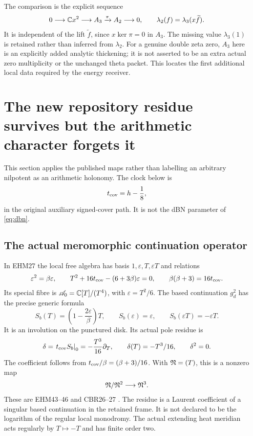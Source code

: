 \documentclass[11pt,a4paper]{article}
\theoremstyle{definition}
\begin{document}
The comparison is the explicit sequence
\[
 0\longrightarrow\mathbb C x^2\longrightarrow A_3
 \xrightarrow{\pi}A_2\longrightarrow0,
 \qquad \lambda_2(f)=\lambda_3(x\widetilde f).
\]
It is independent of the lift $\widetilde f$, since $x\ker\pi=0$ in $A_3$. The missing value $\lambda_3(1)$ is retained rather than inferred from $\lambda_2$. For a genuine double zeta zero, $A_3$ here is an explicitly added analytic thickening; it is not asserted to be an extra actual zero multiplicity or the unchanged theta packet. This locates the first additional local data required by the energy receiver.

\section{The new repository residue survives but the arithmetic character forgets it}
This section applies the published maps rather than labelling an arbitrary nilpotent as an arithmetic holonomy. The clock below is
\[
 t_{\rm cov}=h-\frac18,
\]
in the original auxiliary signed-cover path. It is not the dBN parameter of \eqref{eq:dbn}.

\subsection{The actual meromorphic continuation operator}
In EHM27 the local free algebra has basis $1,\varepsilon,T,\varepsilon T$ and relations
\[
 \varepsilon^2=\beta\varepsilon,
 \qquad T^2+16t_{\rm cov}-(6+3\beta)\varepsilon=0,
 \qquad \beta(\beta+3)=16t_{\rm cov}.
\]
Its special fibre is $\mathscr A_0=\mathbb C[T]/(T^4)$, with $\varepsilon=T^2/6$. The based continuation $g_d^2$ has the precise generic formula
\[
 S_b(T)=\left(1-\frac{2\varepsilon}{\beta}\right)T,
 \qquad S_b(\varepsilon)=\varepsilon,
 \qquad S_b(\varepsilon T)=-\varepsilon T.
\]
It is an involution on the punctured disk. Its actual pole residue is
\begin{equation}\label{eq:delta}
 \delta=\left.t_{\rm cov}S_b\right|_0
 =-\frac{T^3}{16}\partial_T,
 \qquad\delta(T)=-T^3/16,\qquad\delta^2=0.
\end{equation}
The coefficient follows from $t_{\rm cov}/\beta=(\beta+3)/16$. With $\mathfrak N=(T)$, this is a nonzero map
\[
 \mathfrak N/\mathfrak N^2\longrightarrow\mathfrak N^3.
\]
These are EHM43--46 and CBR26--27 \citep{EHM,CBR}. The residue is a Laurent coefficient of a singular based continuation in the retained frame. It is not declared to be the logarithm of the regular local monodromy. The actual extending heat meridian acts regularly by $T\mapsto-T$ and has finite order two.
\end{document}
